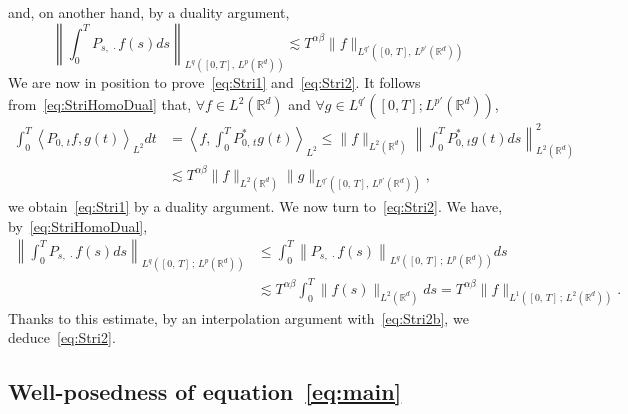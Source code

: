\documentclass[AHL,Unicode,longabstracts,published]{cedram}
\newcommand{\bbR}{\mathbb{R}}
\let\oldforall\forall
\renewcommand*{\forall}{\mathrel{\oldforall}}
\begin{document}
and, on another hand, by a duality argument,
\begin{equation}\label{eq:Stri2b}
\left\| \int_0^T P_{s,\,\cdot} f(s) ds \right\|_{L^{q}\left([0,T],\,L^p\left(\bbR^d\right)\right)} \lesssim T^{\alpha\beta}\|f\|_{L^{q'}\left([0,\,T],\,L^{p'}\left(\bbR^d\right)\right)}
\end{equation}
We are now in position to prove~\eqref{eq:Stri1} and~\eqref{eq:Stri2}. It follows from~\eqref{eq:StriHomoDual} that, $\forall f\in L^2(\bbR^d)$ and $\forall g\in L^{q'}([0,T];L^{p'}(\bbR^d))$,
\begin{align*}
\int_{0}^T \left\langle P_{0,\,t}f,g(t) \right\rangle_{L^2} dt &= \left\langle f, \int_0^T P_{0,\,t}^*g(t)\right\rangle_{L^2} \leq \|f\|_{L^2(\bbR^d)} \left\|\int_0^T P_{0,\,t}^* g(t) ds \right\|_{L^2\left(\bbR^d\right)}^2\\
&\lesssim T^{\alpha\beta}\|f\|_{L^2\left(\bbR^d\right)} \|g\|_{L^{q'}\left([0,\,T],\,L^{p'}\left(\bbR^d\right)\right)},
\end{align*}
we obtain~\eqref{eq:Stri1} by a duality argument. We now turn to~\eqref{eq:Stri2}. We have, by~\eqref{eq:StriHomoDual},
\begin{align*}
\left\|\int_0^T P_{s,\,\cdot} f(s) ds\right\|_{L^q\left([0,\,T]\,;\,L^p\left(\bbR^d\right)\right)} &\leq \int_0^T \left\|P_{s,\,\cdot} f(s) \right\|_{L^q\left([0,\,T]\,;\,L^p\left(\bbR^d\right)\right)} ds
\\
&\lesssim T^{\alpha\beta} \int_0^T \|f(s)\|_{L^2\left(\bbR^d\right)} ds = T^{\alpha\beta} \|f\|_{L^1\left([0,\,T]\,;\,L^2\left(\bbR^d\right)\right)}.
\end{align*}
Thanks to this estimate, by an interpolation argument with~\eqref{eq:Stri2b}, we deduce~\eqref{eq:Stri2}.

\subsection{Well-posedness of equation~\eqref{eq:main}}
\end{document}
